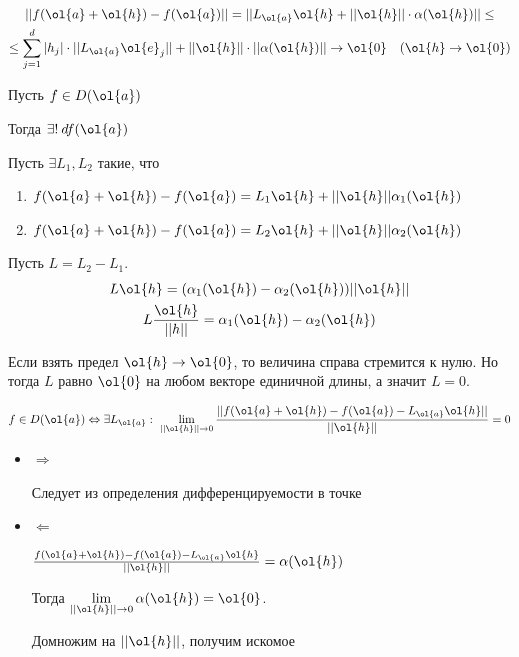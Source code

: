 \begin{gather*}
    ||f( \ol{a} + \ol{h} ) - f(\ol{a})||
    =
    || L_{\ol{a}} \ol{h} + || \ol{h} || \cdot \alpha(\ol{h}) ||
    \leq
    \\
    \leq
    \sum\limits_{j = 1}^{d} |h_j| \cdot || L_{\ol{a}} \ol{e}_j ||
        + || \ol{h} || \cdot || \alpha(\ol{h}) ||
    \to \ol{0} \quad (\ol{h} \to \ol{0})
\end{gather*}

\begin{prop}{}{}
    Пусть \( f \in D(\ol{a}) \)

    Тогда \( \exists! \: df(\ol{a}) \)
\end{prop}

Пусть \( \exists L_1, L_2 \) такие, что
\begin{enumerate}
    \item
        \( f(\ol{a} + \ol{h}) - f(\ol{a}) = L_1 \ol{h} + ||\ol{h} || \alpha_1 (\ol{h}) \)
    \item
        \( f(\ol{a} + \ol{h}) - f(\ol{a}) = L_2 \ol{h} + ||\ol{h} || \alpha_2 (\ol{h}) \)
\end{enumerate}

Пусть \( L = L_2 - L_1 \).
\begin{gather*}
    L \ol{h} = ( \alpha_1(\ol{h}) -\alpha_2(\ol{h}) ) || \ol{h} ||
    \\
    L \frac{\ol{h}}{||h||} = \alpha_1(\ol{h}) -\alpha_2(\ol{h})
\end{gather*}

Если взять предел \( \ol{h} \to \ol{0} \),
то величина справа стремится к нулю.
Но тогда \( L \) равно \( \ol{0} \) на любом векторе единичной длины,
а значит \( L = 0 \).

\begin{prop}{}{}
    \[
        f \in D(\ol{a})
        \Leftrightarrow
        \exists L_{\ol{a}} : \ \lim\limits_{|| \ol{h} || \to 0} \frac{||f(\ol{a} + \ol{h}) - f(\ol{a}) - L_{\ol{a}} \ol{h}||}{||\ol{h}||} = 0
    \]
\end{prop}

\begin{itemize}
    \item
        \( \Rightarrow \)

        Следует из определения дифференцируемости в точке
    \item
        \( \Leftarrow \)

        \( \frac{f(\ol{a} + \ol{h}) - f(\ol{a}) - L_{\ol{a}} \ol{h}}{||\ol{h}||} = \alpha(\ol{h}) \)

        Тогда \( \lim\limits_{|| \ol{h} || \to 0} \alpha(\ol{h}) = \ol{0} \).

        Домножим на \( || \ol{h} || \), получим искомое
\end{itemize}

